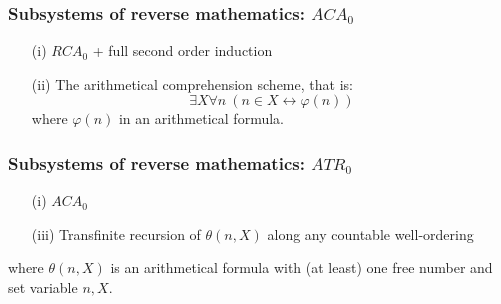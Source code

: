 \documentclass[10pt,danish]{beamer}
\begin{document}
\begin{frame}
 \frametitle{Subsystems of reverse mathematics: $ACA_0$}
\begin{definition}[$ACA_0$]
\begin{enumerate}
\item[(i)] $RCA_0$ + full second order induction
\item[(ii)] The arithmetical comprehension scheme, that is:
\begin{displaymath}
\exists X \forall n\ (n \in X \leftrightarrow \varphi(n))
\end{displaymath}
where $\varphi(n)$ in an arithmetical formula.
\end{enumerate}
\end{definition}
\end{frame}

\begin{frame}
 \frametitle{Subsystems of reverse mathematics: $ATR_0$}
\begin{definition}[$ATR_0$]
\begin{enumerate}
\item[(i)] $ACA_0$
\item[(iii)] Transfinite recursion of $\theta(n,X)$ along any countable well-ordering
\end{enumerate}
where $\theta(n,X)$ is an arithmetical formula with (at least) one free number and set variable $n,X$.
\end{definition}
\end{frame}
\end{document}
